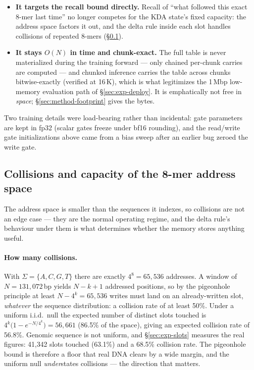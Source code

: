 \documentclass[11pt]{article}
\theoremstyle{plain}
\begin{document}
\begin{itemize}
\item \textbf{It targets the recall bound directly.} Recall of ``what followed this exact 8-mer
last time'' no longer competes for the KDA state's fixed capacity: the address space factors it
out, and the delta rule inside each slot handles collisions of repeated 8-mers
(\S\ref{sec:method-capacity}).
\item \textbf{It stays $O(N)$ in time and chunk-exact.} The full table is never materialized
during the training forward --- only chained per-chunk carries are computed --- and chunked
inference carries the table across chunks bitwise-exactly (verified at 16\,K), which is what
legitimizes the 1\,Mbp low-memory evaluation path of \S\ref{sec:exp-deploy}. It is emphatically
not free in \emph{space}; \S\ref{sec:method-footprint} gives the bytes.
\end{itemize}

Two training details were load-bearing rather than incidental: gate parameters are kept in fp32
(scalar gates freeze under bf16 rounding), and the read/write gate initializations above came
from a bias sweep after an earlier bug zeroed the write gate.

\subsection{Collisions and capacity of the 8-mer address space}\label{sec:method-capacity}

The address space is smaller than the sequences it indexes, so collisions are not an edge case ---
they are the normal operating regime, and the delta rule's behaviour under them is what determines
whether the memory stores anything useful.

\paragraph{How many collisions.} With $\Sigma=\{A,C,G,T\}$ there are exactly $4^8=65{,}536$
addresses. A window of $N=131{,}072$\,bp yields $N-k+1$ addressed positions, so by the pigeonhole
principle at least $N-4^k = 65{,}536$ writes must land on an already-written slot, \emph{whatever}
the sequence distribution: a collision rate of at least 50\%. Under a uniform i.i.d.\ null the
expected number of distinct slots touched is $4^k\bigl(1-e^{-N/4^k}\bigr) = 56{,}661$ (86.5\% of
the space), giving an expected collision rate of 56.8\%. Genomic sequence is not uniform, and
\S\ref{sec:exp-slots} measures the real figures: 41{,}342 slots touched (63.1\%) and a 68.5\%
collision rate. The pigeonhole bound is therefore a floor that real DNA clears by a wide margin,
and the uniform null \emph{under}states collisions --- the direction that matters.
\end{document}
